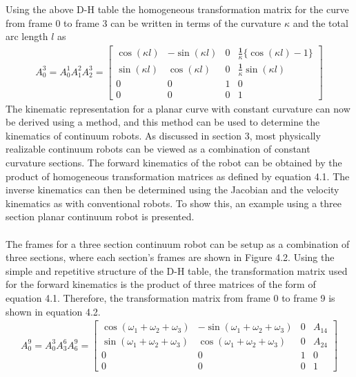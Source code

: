 \documentclass[12pt,twoside,a4]{mwbk}
\begin{document}
\noindent Using the above D-H table the homogeneous transformation matrix for the curve from frame 0 to frame 3 can be written in terms of the curvature $\kappa$ and the total arc length $l$ as
\begin{subequations}
\begin{align}
    A_{0}^{3}=A_{0}^{1}A_{1}^{2}A_{2}^{3}=\left[\begin{array}{cccc}
\cos (\kappa l) & -\sin (\kappa l) & 0 & \frac{\mathbf{1}}{\kappa}\{\cos (\kappa l)-1\} \\
\sin (\kappa l) & \cos (\kappa l) & 0 & \frac{\mathbf{1}}{\kappa} \sin (\kappa l) \\
0 & 0 & 1 & 0 \\
0 & 0 & 0 & 1
\end{array}\right]
\end{align}
\end{subequations}
The kinematic representation for a planar curve with constant curvature can now be derived using a method, and this method can be used to determine the kinematics of continuum robots. As discussed in section 3, most physically realizable continuum robots can be viewed as a combination of constant curvature sections. The forward kinematics of the robot can be obtained by the product of homogeneous transformation matrices as defined by equation 4.1. The inverse kinematics can then be determined using the Jacobian and the velocity kinematics as with conventional robots. To show this, an example using a three section planar continuum robot is presented.
\\ \\
The frames for a three section continuum robot can be setup as a combination of three sections, where each section's frames are shown in Figure 4.2. Using the simple and repetitive structure of the D-H table, the transformation matrix used for the forward kinematics is the product of three matrices of the form of equation 4.1. Therefore, the transformation matrix from frame 0 to frame 9 is shown in equation 4.2.
\begin{subequations}
\begin{align}
A_{0}^{9}= A_{0}^{3}A_{3}^{6}A_{6}^{9} = \left[\begin{array}{cccc}
\cos \left(\omega_{1}+\omega_{2}+\omega_{3}\right) & -\sin \left(\omega_{1}+\omega_{2}+\omega_{3}\right) & 0 & A_{14} \\
\sin \left(\omega_{1}+\omega_{2}+\omega_{3}\right) & \cos \left(\omega_{1}+\omega_{2}+\omega_{3}\right) & 0 & A_{24} \\
0 & 0 & 1 & 0 \\
0 & 0 & 0 & 1
\end{array}\right]
\end{align}
\end{subequations}
\end{document}
